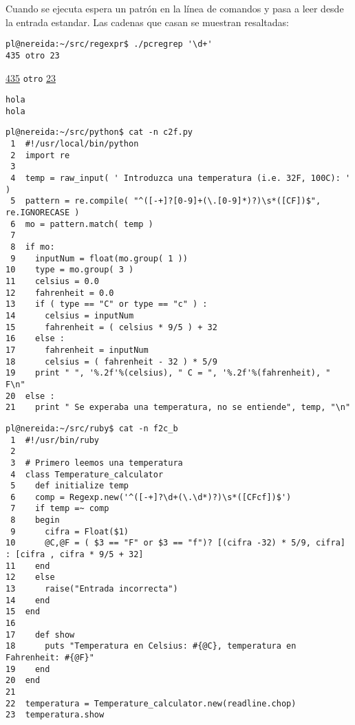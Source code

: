Cuando se ejecuta espera un patrón en la línea de comandos
y pasa a leer desde la entrada estandar. Las cadenas que casan
se muestran resaltadas:
\begin{verbatim}
pl@nereida:~/src/regexpr$ ./pcregrep '\d+'
435 otro 23
\end{verbatim}
\noindent \underline{435} {\tt otro} \underline{23}
\begin{verbatim}
hola
hola
\end{verbatim}



\begin{verbatim}
pl@nereida:~/src/python$ cat -n c2f.py
 1  #!/usr/local/bin/python
 2  import re
 3
 4  temp = raw_input( ' Introduzca una temperatura (i.e. 32F, 100C): ' )
 5  pattern = re.compile( "^([-+]?[0-9]+(\.[0-9]*)?)\s*([CF])$", re.IGNORECASE )
 6  mo = pattern.match( temp )
 7
 8  if mo:
 9    inputNum = float(mo.group( 1 ))
10    type = mo.group( 3 )
11    celsius = 0.0
12    fahrenheit = 0.0
13    if ( type == "C" or type == "c" ) :
14      celsius = inputNum
15      fahrenheit = ( celsius * 9/5 ) + 32
16    else :
17      fahrenheit = inputNum
18      celsius = ( fahrenheit - 32 ) * 5/9
19    print " ", '%.2f'%(celsius), " C = ", '%.2f'%(fahrenheit), " F\n"
20  else :
21    print " Se experaba una temperatura, no se entiende", temp, "\n"
\end{verbatim}



\begin{verbatim}
pl@nereida:~/src/ruby$ cat -n f2c_b
 1  #!/usr/bin/ruby
 2
 3  # Primero leemos una temperatura
 4  class Temperature_calculator
 5    def initialize temp
 6    comp = Regexp.new('^([-+]?\d+(\.\d*)?)\s*([CFcf])$')
 7    if temp =~ comp
 8    begin
 9      cifra = Float($1)
10      @C,@F = ( $3 == "F" or $3 == "f")? [(cifra -32) * 5/9, cifra] : [cifra , cifra * 9/5 + 32]
11    end
12    else
13      raise("Entrada incorrecta")
14    end
15  end
16
17    def show
18      puts "Temperatura en Celsius: #{@C}, temperatura en Fahrenheit: #{@F}"
19    end
20  end
21
22  temperatura = Temperature_calculator.new(readline.chop)
23  temperatura.show
\end{verbatim}


